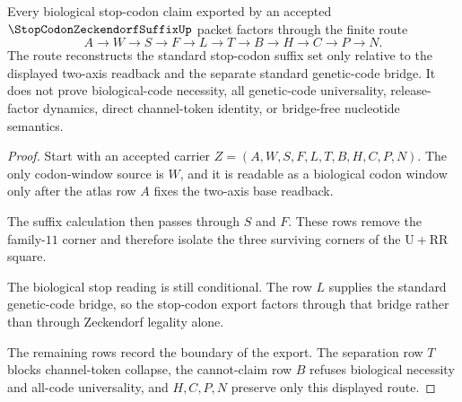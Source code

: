 \begin{theorem}
\label{thm:stop-codon-zeckendorf-suffix-bridge-boundary}
Every biological stop-codon claim exported by an accepted $\StopCodonZeckendorfSuffixUp$ packet factors through the finite route
$$
A \to W \to S \to F \to L \to T \to B \to H \to C \to P \to N.
$$
The route reconstructs the standard stop-codon suffix set only relative to the displayed two-axis readback and the separate standard genetic-code bridge. It does not prove biological-code necessity, all genetic-code universality, release-factor dynamics, direct channel-token identity, or bridge-free nucleotide semantics.
\end{theorem}
\begin{proof}
Start with an accepted carrier $Z=(A,W,S,F,L,T,B,H,C,P,N)$. The only codon-window source is $W$, and it is readable as a biological codon window only after the atlas row $A$ fixes the two-axis base readback.

The suffix calculation then passes through $S$ and $F$. These rows remove the family-$11$ corner and therefore isolate the three surviving corners of the $\mathrm{U}+\mathrm{RR}$ square.

The biological stop reading is still conditional. The row $L$ supplies the standard genetic-code bridge, so the stop-codon export factors through that bridge rather than through Zeckendorf legality alone.

The remaining rows record the boundary of the export. The separation row $T$ blocks channel-token collapse, the cannot-claim row $B$ refuses biological necessity and all-code universality, and $H,C,P,N$ preserve only this displayed route.
\end{proof}

